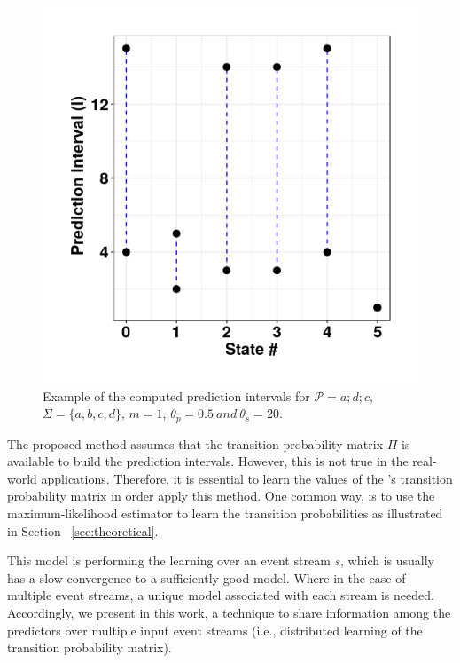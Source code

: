 \begin{figure}[H]
	\begin{centering}
		\center
			\includegraphics[width=\textwidth]{chapters/figures/prediction_intervals_v2.png}
					
		\caption{Example of the computed prediction intervals for
			$\mathcal{P}=a ; d ; c$, $\Sigma=\{a,b,c,d\}$, $m=1$, $\theta_{p}=0.5\ and\ \theta_{s}=20$.}
		\label{fig:predictionsIntervals}
	\end{centering}
\end{figure}

\par The proposed method assumes that the transition probability matrix $\Pi$ is available to build the prediction intervals. However, this is not true in the real-world applications.
Therefore, it is essential to learn the values of the \pmcmr's transition probability matrix in order apply this method. One common way, is to use the maximum-likelihood estimator to learn the transition probabilities as illustrated in Section ~\ref{sec:theoretical}. 

\par This model is performing the learning over an event stream $s$, which is usually has a slow convergence to a sufficiently good model. Where in the case of multiple event streams, a unique model associated with each stream is needed. Accordingly, we present in this work, a technique to share information among the \pmcmr predictors over multiple input event streams (i.e., distributed learning of the transition probability matrix).

